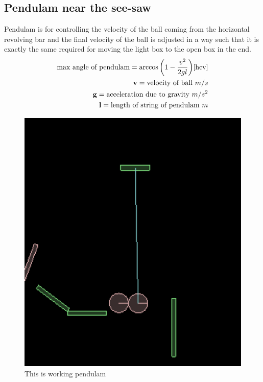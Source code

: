 \documentclass[11pt]{article}
\begin{document}
\subsection{Pendulam near the see-saw}
Pendulam is for controlling the velocity of the ball coming from the horizontal revolving bar and the final velocity of the ball is adjusted in a way such that it is exactly the same required for moving the light box to the open box in the end.
\begin{equation}
\begin{split}
\text{max angle of pendulam} = \arccos{\left( 1-\frac {v^2} {2gl} \right)}\cite{hcv}\\
\mathbf{v}=\text{velocity of ball } m/s\\
\mathbf{g}=\text{acceleration due to gravity } m/s^2\\
\mathbf{l}=\text{length of string of pendulam } m\\
\end{split}
\end{equation}
\begin{figure}[!ht]
\centering
\includegraphics[scale=0.25]{pendulam}
\caption{This is working pendulam}
\label{fig1}
\end{figure}
\end{document}
